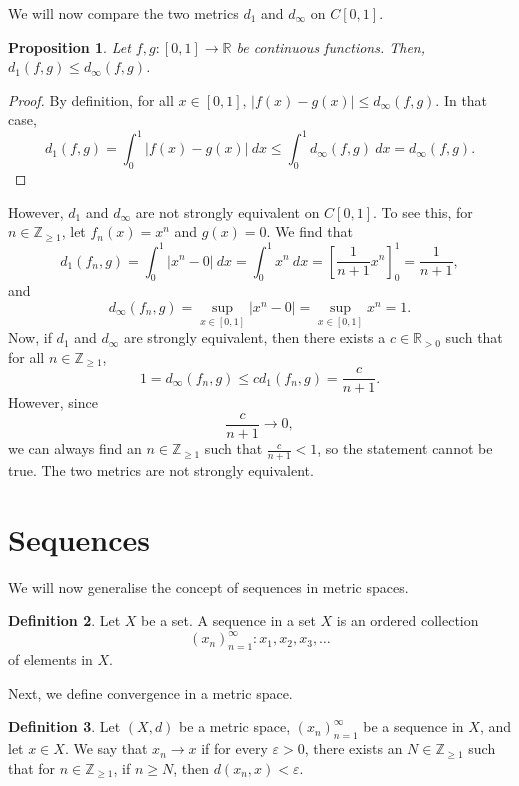 \documentclass[a4paper, openany]{memoir}
\theoremstyle{definition}
\newtheorem{definition}{Definition}[section]
\theoremstyle{plain}
\newtheorem{proposition}[definition]{Proposition}
\begin{document}
We will now compare the two metrics $d_1$ and $d_\infty$ on $C[0, 1]$.
\begin{proposition}
Let $f, g: [0, 1] \to \mathbb{R}$ be continuous functions. Then, $d_1(f, g) \leqslant d_\infty(f, g)$.
\end{proposition}
\begin{proof}
By definition, for all $x \in [0, 1]$, $|f(x) - g(x)| \leqslant d_\infty(f, g)$. In that case,
\[d_1(f, g) = \int_0^1 |f(x) - g(x)| \ dx \leqslant \int_0^1 d_\infty(f, g) \ dx = d_\infty(f, g).\]
\end{proof}
\noindent However, $d_1$ and $d_\infty$ are not strongly equivalent on $C[0, 1]$. To see this, for $n \in \mathbb{Z}_{\geqslant 1}$, let $f_n(x) = x^n$ and $g(x) = 0$. We find that
\[d_1(f_n, g) = \int_0^1 |x^n - 0| \ dx = \int_0^1 x^n \ dx = \left[\frac{1}{n+1} x^n\right]_0^1 = \frac{1}{n+1},\]
and
\[d_\infty(f_n, g) = \sup_{x \in [0, 1]} |x^n - 0| = \sup_{x \in [0, 1]} x^n = 1.\]
Now, if $d_1$ and $d_\infty$ are strongly equivalent, then there exists a $c \in \mathbb{R}_{> 0}$ such that for all $n \in \mathbb{Z}_{\geqslant 1}$,
\[1 = d_\infty(f_n, g) \leqslant c d_1(f_n, g) = \frac{c}{n+1}.\]
However, since
\[\frac{c}{n+1} \to 0,\]
we can always find an $n \in \mathbb{Z}_{\geqslant 1}$ such that $\frac{c}{n+1} < 1$, so the statement cannot be true. The two metrics are not strongly equivalent.
\newpage

\section{Sequences}
We will now generalise the concept of sequences in metric spaces. 
\begin{definition}
Let $X$ be a set. A sequence in a set $X$ is an ordered collection 
\[(x_n)_{n=1}^{\infty} : x_1, x_2, x_3, \dots\]
of elements in $X$.
\end{definition}
\noindent Next, we define convergence in a metric space.
\begin{definition}
Let $(X, d)$ be a metric space,  $(x_n)_{n=1}^{\infty}$ be a sequence in $X$, and let $x \in X$. We say that $x_n \to x$ if for every $\varepsilon > 0$, there exists an $N \in \mathbb{Z}_{\geqslant 1}$ such that for $n \in \mathbb{Z}_{\geqslant 1}$, if $n \geqslant N$, then $d(x_n, x) < \varepsilon$. 
\end{definition}
\end{document}
